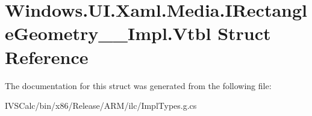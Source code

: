 \hypertarget{struct_windows_1_1_u_i_1_1_xaml_1_1_media_1_1_i_rectangle_geometry_____impl_1_1_vtbl}{}\section{Windows.\+U\+I.\+Xaml.\+Media.\+I\+Rectangle\+Geometry\+\_\+\+\_\+\+Impl.\+Vtbl Struct Reference}
\label{struct_windows_1_1_u_i_1_1_xaml_1_1_media_1_1_i_rectangle_geometry_____impl_1_1_vtbl}


The documentation for this struct was generated from the following file\+:\begin{DoxyCompactItemize}
\item 
I\+V\+S\+Calc/bin/x86/\+Release/\+A\+R\+M/ilc/Impl\+Types.\+g.\+cs\end{DoxyCompactItemize}
